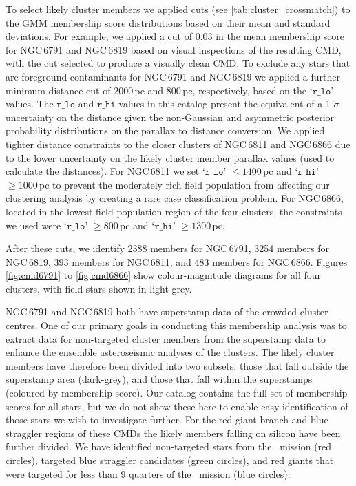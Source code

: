 To select likely cluster members we applied cuts (see \cref{tab:cluster_crossmatch}) to the GMM membership score distributions based on their mean and standard deviations. For example, we applied a cut of 0.03 in the mean membership score for NGC\,6791 and NGC\,6819 based on visual inspections of the resulting CMD, with the cut selected to produce a visually clean CMD. To exclude any stars that are foreground contaminants for NGC\,6791 and NGC\,6819 we applied a further minimum distance cut of 2000\,pc and 800\,pc, respectively, based on the \cite{bailer-jones_estimating_2018} `$\texttt{r\_lo}$' values. The $\texttt{r\_lo}$ and $\texttt{r\_hi}$ values in this catalog present the equivalent of a 1-$\sigma$ uncertainty on the distance given the non-Gaussian and asymmetric posterior probability distributions on the parallax to distance conversion. %
We applied tighter distance constraints to the closer clusters of NGC\,6811 and NGC\,6866 due to the lower uncertainty on the likely cluster member parallax values (used to calculate the distances). For NGC\,6811 we set `$\texttt{r\_lo}$' $\leq 1400$\,pc and `$\texttt{r\_hi}$' $\geq 1000$\,pc to prevent the moderately rich field population \citep{janes_open_2014} from affecting our clustering analysis by creating a rare case classification problem. For NGC\,6866, located in the lowest field population region of the four clusters, the constraints we used were `$\texttt{r\_lo}$' $\geq 800$\,pc and `$\texttt{r\_hi}$' $\geq 1300$\,pc.

After these cuts, we identify 2388 members for NGC\,6791, 3254 members for NGC\,6819, 393 members for NGC\,6811, and 483 members for NGC\,6866. Figures \ref{fig:cmd6791} to \ref{fig:cmd6866} show colour-magnitude diagrams for all four clusters, with field stars shown in light grey. 

NGC\,6791 and NGC\,6819 both have superstamp data of the crowded cluster centres. One of our primary goals in conducting this membership analysis was to extract data for non-targeted cluster members from the superstamp data to enhance the ensemble asteroseismic analyses of the clusters. The likely cluster members have therefore been divided into two subsets: those that fall outside the superstamp area (dark-grey), and those that fall within the superstamps (coloured by membership score). Our catalog contains the full set of membership scores for all stars, but we do not show these here to enable easy identification of those stars we wish to investigate further. For the red giant branch and blue straggler regions of these CMDs the likely members falling on silicon have been further divided. We have identified non-targeted stars from the \Kepler~mission (red circles), targeted blue straggler candidates (green circles), and red giants that were targeted for less than 9 quarters of the \Kepler~mission (blue circles). 

